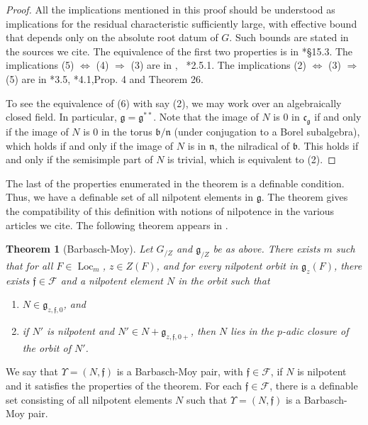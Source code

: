 \documentclass[12pt]{amsart}
\newcommand{\op}[1]{\operatorname{#1}}
\def\Y{\Upsilon}
\def\s{{\mathfrak{f}}}
\newcommand{\cF}{\mathcal{F}}
\newcommand{\fg}{\mathfrak{g}}
\newcommand{\fb}{\mathfrak{b}}
\newcommand{\fn}{\mathfrak{n}}
\newcommand{\fc}{\mathfrak{c}}
\theoremstyle{plain}
\newtheorem{theorem}[thm]{Theorem}
\theoremstyle{definition}
\begin{document}
\begin{proof} All the implications mentioned in this proof should be
  understood as implications for the residual characteristic
  sufficiently large, with effective bound that depends only on the
  absolute root datum of $G$. Such bounds are stated in the sources we
  cite. The equivalence of the first two properties is in 
  \cite{humphreys1975linear}*{\S15.3}.  The implications (5)
  $\Leftrightarrow$ (4) $\Rightarrow$ (3) are in \cite{debacker:nilp},
  ~\cite{adler-debacker:bt-lie}*{2.5.1}.  The implications (2)
  $\Leftrightarrow$ (3) $\Rightarrow$ (5) are in \cite{mcninch}*{3.5},
  \cite{mcninch}*{4.1,Prop. 4 and Theorem 26}.

  To see the equivalence of (6) with say (2), we may work over an
  algebraically closed field. In particular, $\fg = \fg^{**}$.  Note
  that the image of $N$ is $0$ in $\fc_{\fg}$ if and only if the image
  of $N$ is $0$ in the torus $\fb/\fn$ (under conjugation to a Borel
  subalgebra), which holds if and only if the image of $N$ is in
  $\fn$, the nilradical of $\fb$.  This holds if and only if the
  semisimple part of $N$ is trivial, which is equivalent to (2).
\end{proof}

The last of the properties enumerated in the theorem is a definable
condition.  Thus, we have a definable set of all nilpotent elements in
$\fg$.  The theorem gives the compatibility of this definition with
notions of nilpotence in the various articles we cite.  The following
theorem appears in \cite{barbasch-moy}.

\begin{theorem}[Barbasch-Moy]\label{thm:bm} 
  Let $G_{/Z}$ and $\fg_{/Z}$ be as above.  There exists $m$ such that
  for all $F\in \op{Loc}_m$, $z\in Z(F)$, and for every nilpotent
  orbit in $\fg_z(F)$, there exists $\s\in \cF$ and a nilpotent
  element $N$ in the orbit such that
\begin{enumerate}
   \item $N\in \fg_{z,\s,0}$, and
   \item if $N'$ is nilpotent and $N'\in N + \fg_{z,\s,0+}$, then $N$
     lies in the $p$-adic closure of the orbit of $N'$.
\end{enumerate}
\end{theorem}

We say that $\Y=(N,\s)$ is a Barbasch-Moy pair, with $\s\in \cF$, if $N$
is nilpotent and it satisfies the properties of the theorem.  For each
$\s\in \cF$, there is a definable set consisting of all nilpotent
elements $N$ such that $\Y=(N,\s)$ is a
Barbasch-Moy pair.
\end{document}
